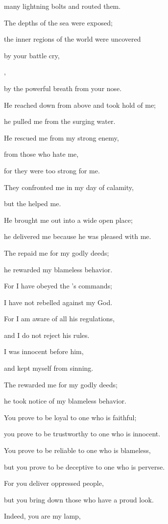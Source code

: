 {\par }{\Q many
lightning
bolts
and routed them.
\par }{\Q {}The depths
of the sea were exposed;
\par }{\Q the inner regions
of the world
were uncovered
\par }{\Q by
your battle cry,

{},
\par }{\Q by
the powerful breath
from your nose.
\par }{\Q {}He reached
down from above
and took
hold of me;
\par }{\Q he pulled
me from the surging
water.
\par }{\Q {}He rescued me from my strong
enemy,
\par }{\Q from those who hate
me,
\par }{\Q for
they were too
strong for me.
\par }{\Q {}They confronted
me in my day
of calamity,
\par }{\Q but the
{}
helped me.
\par }{\Q {}He brought
me out
into a wide open place;
\par }{\Q he delivered
me because
he was pleased with me.
\par }{\Q {}The
{}
repaid
me for my godly
deeds;

\par }{\Q he rewarded
my blameless
behavior.
\par }{\Q {}For
I have obeyed
the
{}’s
commands;
\par }{\Q I have not
rebelled
against my God.
\par }{\Q {}For
I am aware
of all
his regulations,
\par }{\Q and I do not
reject
his rules.
\par }{\Q {}I was
innocent
before him,
\par }{\Q and kept
myself from sinning.
\par }{\Q {}The
{}
rewarded
me for my godly
deeds;

\par }{\Q he took notice of my blameless
behavior.
\par }{\Q {}You prove
to be loyal
to one who is faithful;
\par }{\Q you prove
to be trustworthy
to one who is
innocent.
\par }{\Q {}You prove
to be
reliable to
one who is blameless,
\par }{\Q but
you prove to be deceptive
to one who is perverse.
\par }{\Q {}For
you
deliver
oppressed
people,
\par }{\Q but you bring down those who have a proud look.
\par }{\Q {}Indeed,
you
are my lamp,

}
